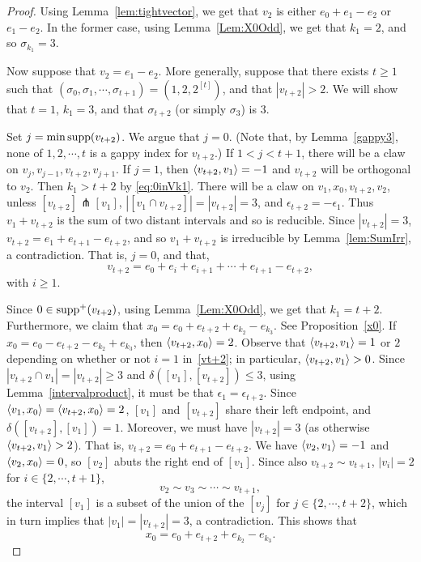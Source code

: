 \begin{proof}
Using Lemma~\ref{lem:tightvector}, we get that $v_2$ is either $e_0+e_1-e_2$ or $e_1-e_2$. In the former case, using Lemma~\ref{Lem:X0Odd}, we get that $k_1=2$, and so $\sigma_{k_1}=3$. 

Now suppose that $v_2=e_1-e_2$. More generally, suppose that there exists $t\ge 1$ such that $(\sigma_0, \sigma_1, \cdots, \sigma_{t+1})=(1,2,2^{[t]})$, and that $|v_{t+2}|>2$. We will show that $t=1$, $k_1=3$, and that $\sigma_{t+2}$ (or simply $\sigma_3$) is $3$. 

Set $j=\min\operatorname{supp}(v_{t+2})$. We argue that $j=0$. (Note that, by Lemma~\ref{gappy3}, none of $1,2, \cdots, t$ is a gappy index for $v_{t+2}$.) If $1<j<t+1$, there will be a claw on $v_j, v_{j-1}, v_{t+2}, v_{j+1}$. If $j=1$, then $\left\langle v_{t+2} , v_1 \right\rangle=-1$ and $v_{t+2}$ will be orthogonal to $v_2$. Then $k_1>t+2$ by \eqref{eq:0inVk1}.
There will be a claw on $v_1, x_0, v_{t+2}, v_2$, unless $[v_{t+2}]\pitchfork [v_1]$, $|[v_1\cap v_{t+2}]|=|v_{t+2}|=3$, and $\epsilon_{t+2}=-\epsilon_1$. Thus $v_1+v_{t+2}$ is the sum of two distant intervals and so is reducible. Since $|v_{t+2}|=3$, $v_{t+2}=e_1+e_{t+1}-e_{t+2}$, and so $v_1+v_{t+2}$ is irreducible by Lemma~\ref{lem:SumIrr}, a contradiction. That is, $j=0$, and that, 
\begin{equation}\label{vt+2}
v_{t+2}=e_0+e_{i}+e_{i+1} + \cdots + e_{t+1}-e_{t+2},
\end{equation}
with $i\ge 1$. 

Since $0\in \operatorname{supp}^+(v_{t+2})$, using Lemma~\ref{Lem:X0Odd}, we get that $k_1=t+2$. Furthermore, we claim that 
$x_0=e_0+e_{t+2}+e_{k_2}-e_{k_3}$. See Proposition~\ref{x0}. If $x_0=e_0-e_{t+2}-e_{k_2}+e_{k_3}$, then $\left\langle v_{t+2} , x_0 \right\rangle=2$. 
Observe that $\left\langle v_{t+2} , v_1 \right\rangle=1$ or $2$ depending on whether or not $i=1$ in~\eqref{vt+2}; in particular, $\left\langle v_{t+2} , v_1 \right\rangle>0$. Since $|v_{t+2}\cap v_1|=|v_{t+2}|\ge 3$ and $\delta([v_1],[v_{t+2}])\le 3$, using Lemma~\ref{intervalproduct}, it must be that $\epsilon_1 = \epsilon_{t+2}$. Since $\left\langle v_1 , x_0 \right\rangle=\left\langle v_{t+2} , x_0 \right\rangle=2$, $[v_1]$ and $[v_{t+2}]$ share their left endpoint, and $\delta([v_{t+2}], [v_1])=1$. Moreover, we must have $|v_{t+2}|=3$ (as otherwise $\left\langle v_{t+2} , v_1 \right\rangle>2$). That is, $v_{t+2}=e_0+e_{t+1}-e_{t+2}$. We have $\left\langle v_2 , v_1 \right\rangle=-1$ and $\left\langle v_2 , x_0 \right\rangle=0$, so $[v_2]$ abuts the right end of $[v_1]$.
Since also $v_{t+2}\sim v_{t+1}$, $|v_i|=2$ for $i\in \{ 2, \cdots, t+1\}$,
\[
v_2\sim v_3\sim\cdots\sim v_{t+1},
\]
 the interval $[v_1]$ is a subset of the union of the $[v_j]$ for $j\in \{ 2, \cdots, t+2\}$, which in turn implies that $|v_1|=|v_{t+2}|=3$, a contradiction. This shows that 
\[
x_0=e_0+e_{t+2}+e_{k_2}-e_{k_3}.
\]


\end{proof}
